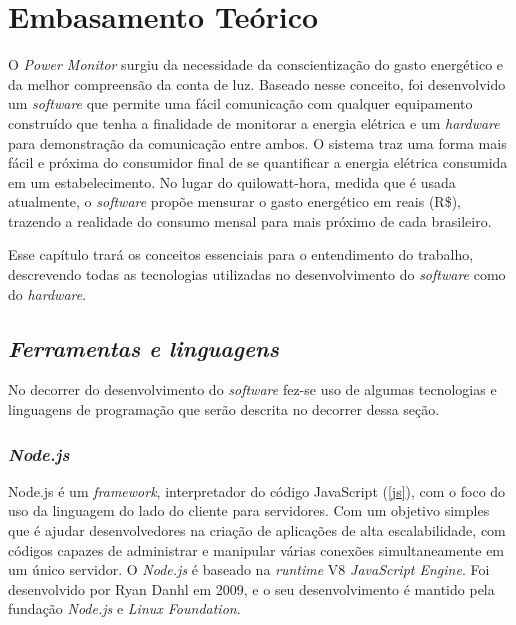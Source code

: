 \chapter[Embasamento Teórico]{Embasamento Teórico}
\label{ch:cap2}
O \textit{Power Monitor} surgiu da necessidade da conscientização do gasto energético e da melhor compreensão da conta de luz. Baseado nesse conceito,
foi desenvolvido um \textit{software} que permite uma fácil comunicação com qualquer equipamento construído que tenha a finalidade de monitorar a energia elétrica e um \textit{hardware} para demonstração
da comunicação entre ambos.
O sistema traz uma forma mais fácil e próxima do consumidor final de se quantificar a energia elétrica consumida em um estabelecimento. No lugar do quilowatt-hora, medida que é usada atualmente,
o \textit{software} propõe mensurar o gasto energético em reais (R\$), trazendo a realidade do consumo mensal para mais próximo de cada brasileiro.

Esse capítulo trará os conceitos essenciais para o entendimento do trabalho, descrevendo todas as tecnologias utilizadas no desenvolvimento 
do \textit{software} como do \textit{hardware}.

\section[\textit{Ferramentas e linguagens}]{\textit{Ferramentas e linguagens}}\label{ferramenta-linguagem}
No decorrer do desenvolvimento do \textit{software} fez-se uso de algumas tecnologias e linguagens de programação que serão descrita no decorrer
dessa seção.
\subsection[\textit{Node.js}]{\textit{Node.js}}\label{node}
Node.js é um \textit{framework}, interpretador do código JavaScript (\autoref{js}), com o foco do uso da linguagem do lado do cliente para servidores. Com um objetivo simples
que é ajudar desenvolvedores na criação de aplicações de alta escalabilidade, com códigos capazes de administrar e manipular várias conexões simultaneamente
em um único servidor. O \textit{Node.js} é baseado na \textit{runtime} V8 \textit{JavaScript Engine}. Foi desenvolvido por Ryan Danhl em 2009, e o seu desenvolvimento
é mantido pela fundação \textit{Node.js} e \textit{Linux Foundation}. 
